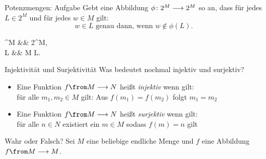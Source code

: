 \begin{frame}{Potenzmengen: Aufgabe}
	Gebt eine Abbildung $\phi \colon 2^{M} \longrightarrow 2^{M}$ so an,
	dass für jedes $L \in 2^{M}$ und für jedes $w \in M$ gilt:
	\begin{equation*}
		w \in L \text{ genau dann, wenn } w \notin \phi(L).
	\end{equation*}
	
	\pause
	\begin{threealign}
		\phi {}^{M} &\functionto& 2^{M},\\
		L &\mapsto& M \setminus L.
	\end{threealign}
\end{frame}



\begin{frame}[t]{Injektivität und Surjektivität}
	Was bedeutet nochmal injektiv und surjektiv?
	\begin{itemize}
		\item Eine Funktion $ f \from M \functionto N $ heißt \textit{injektiv} wenn gilt: \\
			\pause
			für alle $m_1,m_2 \in M$ gilt: Aus $ f(m_1)=f(m_2) $ folgt $ m_1 = m_2 $
		\pause
		\item Eine Funktion $ f \from M \functionto N $ heißt \textit{surjektiv} wenn gilt: \\
			\pause
			für alle $n \in N$ existiert ein $m \in M$ sodass $f(m)=n$ gilt
	\end{itemize}
	\pause
	\begin{block}{Wahr oder Falsch?}
		Sei $M$ eine beliebige endliche Menge und $f$ eine Abbildung $f \from M \functionto M$. \\
	\end{block}
\end{frame}




